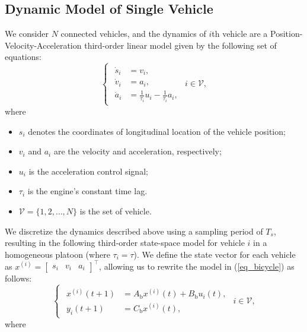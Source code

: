 \documentclass[letterpaper, 10pt, conference]{ieeeconf}  %
\def\eqref#1{(\ref{#1})}
\def\V{\mathcal{V}} %
\begin{document}
\subsection{Dynamic Model of Single Vehicle}
We consider $N$ connected vehicles, and
the dynamics of $i$th vehicle are a Position-Velocity-Acceleration third-order linear model given by the following set of equations:
\begin{equation}
\begin{cases}
    \begin{aligned} 
    \dot{s}_i &= v_i,  \\  
    \dot{v}_i &= a_i, \\ 
    \dot{a}_i &= \frac{1}{\tau_i}u_i - \frac{1}{\tau_i}a_i,
\end{aligned}
\end{cases} i \in \V ,
\label{eq_bicycle}
\end{equation}
where
\begin{itemize}
    \item ${s}_{i}$ denotes the coordinates of longitudinal location of the vehicle position;
    \item $v_{i}$ and $a_{i}$ are the velocity and acceleration, respectively;
    \item $u_{i}$ is the acceleration control signal; 
    \item $\tau_i$ is the engine's constant time lag.
    \item  $\V = \{1, 2, \dots, N\}$ is the set of vehicle.
\end{itemize}
We discretize the dynamics described above using a sampling period of \( T_s \), resulting in the following third-order state-space model for vehicle \( i \) in a homogeneous platoon (where \( \tau_i = \tau \)). We define the state vector for each vehicle as $x^{(i)} = \begin{bmatrix} s_i & v_i & a_i \end{bmatrix}^{\top}$, allowing us to rewrite the model in \eqref{eq_bicycle} as follows:
\begin{equation}
\begin{cases}
    \begin{aligned}
        x^{(i)}(t+1) &= A_{\text{b}} x^{(i)}(t) + B_{\text{b}}u_{i}(t), \\
        y_{i}(t+1) &= C_{\text{b}} x^{(i)}(t),
    \end{aligned}
\end{cases} i \in \V,
\end{equation}
where
\end{document}
